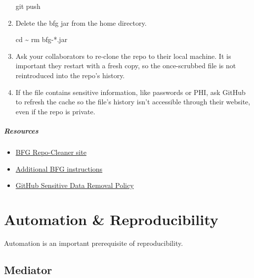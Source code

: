 \documentclass[
]{book}
\newenvironment{Shaded}{\begin{snugshade}}{\end{snugshade}}
\newcommand{\BuiltInTok}[1]{#1}
\newcommand{\FunctionTok}[1]{\textcolor[rgb]{0.00,0.00,0.00}{#1}}
\newcommand{\NormalTok}[1]{#1}
\providecommand{\tightlist}{%
  \setlength{\itemsep}{0pt}\setlength{\parskip}{0pt}}
\begin{document}
\begin{enumerate}
\begin{Shaded}
\begin{Highlighting}[]
\FunctionTok{git}\NormalTok{ push}
\end{Highlighting}
\end{Shaded}
\item
  Delete the bfg jar from the home directory.

\begin{Shaded}
\begin{Highlighting}[]
\BuiltInTok{cd}\NormalTok{ \textasciitilde{}}
\FunctionTok{rm}\NormalTok{ bfg{-}*.jar}
\end{Highlighting}
\end{Shaded}
\item
  Ask your collaborators to re-clone the repo to their local machine. It is important they restart with a fresh copy, so the once-scrubbed file is not reintroduced into the repo's history.
\item
  If the file contains sensitive information, like passwords or PHI, ask GitHub to refresh the cache so the file's history isn't accessible through their website, even if the repo is private.
\end{enumerate}

\hypertarget{resources}{%
\paragraph{Resources}\label{resources}}

\begin{itemize}
\tightlist
\item
  \href{https://rtyley.github.io/bfg-repo-cleaner/}{BFG Repo-Cleaner site}
\item
  \href{https://github.com/IBM/BluePic/wiki/Using-BFG-Repo-Cleaner-tool-to-remove-sensitive-files-from-your-git-repo}{Additional BFG instructions}
\item
  \href{https://help.github.com/articles/github-sensitive-data-removal-policy/}{GitHub Sensitive Data Removal Policy}
\end{itemize}

\hypertarget{automation}{%
\chapter{Automation \& Reproducibility}\label{automation}}

Automation is an important prerequisite of reproducibility.

\hypertarget{automation-mediator}{%
\section{Mediator}\label{automation-mediator}}
\end{document}
